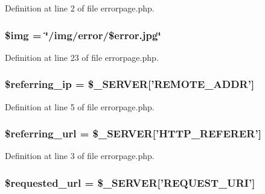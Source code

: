 Definition at line 2 of file errorpage.\+php.

\hypertarget{errorpage_8php_a56a9a0da0c26b3d3029cea47a6b9292f}{
\subsubsection[{\$img}]{\setlength{\rightskip}{0pt plus 5cm}\$img = \char`\"{}/img/error/\$error.\+jpg\char`\"{}}}\label{errorpage_8php_a56a9a0da0c26b3d3029cea47a6b9292f}


Definition at line 23 of file errorpage.\+php.

\hypertarget{errorpage_8php_ab8e19a239e2e9e057a08c7cb0ba2a832}{
\subsubsection[{\$referring\+\_\+ip}]{\setlength{\rightskip}{0pt plus 5cm}\$referring\+\_\+ip = \$\+\_\+\+S\+E\+R\+V\+E\+R\mbox{[}'R\+E\+M\+O\+T\+E\+\_\+\+A\+D\+D\+R'\mbox{]}}}\label{errorpage_8php_ab8e19a239e2e9e057a08c7cb0ba2a832}


Definition at line 5 of file errorpage.\+php.

\hypertarget{errorpage_8php_ad29da35a7cf10daf39c9ce647e7e30e3}{
\subsubsection[{\$referring\+\_\+url}]{\setlength{\rightskip}{0pt plus 5cm}\$referring\+\_\+url = \$\+\_\+\+S\+E\+R\+V\+E\+R\mbox{[}'H\+T\+T\+P\+\_\+\+R\+E\+F\+E\+R\+E\+R'\mbox{]}}}\label{errorpage_8php_ad29da35a7cf10daf39c9ce647e7e30e3}


Definition at line 3 of file errorpage.\+php.

\hypertarget{errorpage_8php_a479ad54df71804ffafdcecb6f67ab5e4}{
\subsubsection[{\$requested\+\_\+url}]{\setlength{\rightskip}{0pt plus 5cm}\$requested\+\_\+url = \$\+\_\+\+S\+E\+R\+V\+E\+R\mbox{[}'R\+E\+Q\+U\+E\+S\+T\+\_\+\+U\+R\+I'\mbox{]}}}\label{errorpage_8php_a479ad54df71804ffafdcecb6f67ab5e4}



